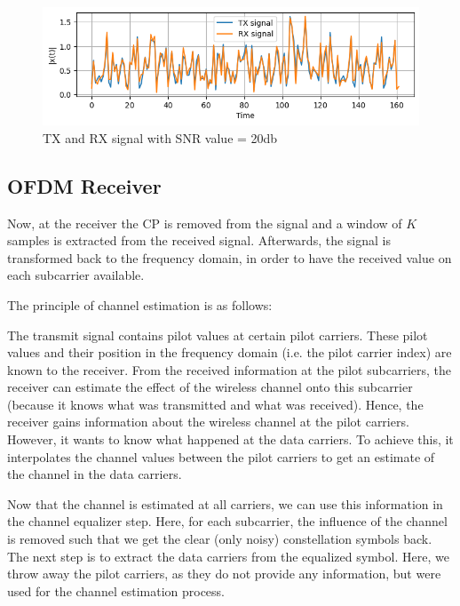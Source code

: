 \begin{figure}[htbp]
    \centering
    \includegraphics[width=\textwidth]{../Source/results/tx_rx}
    \caption{TX and RX signal with SNR value = 20db}
    \label{tx_rx}
\end{figure}

\subsection{OFDM Receiver}

Now, at the receiver the CP is removed from the signal and a window of $K$ samples is extracted from the received signal. Afterwards, the signal is transformed back to the frequency domain, in order to have the received value on each subcarrier available.

The principle of channel estimation is as follows:

The transmit signal contains pilot values at certain pilot carriers. These pilot values and their position in the frequency domain (i.e. the pilot carrier index) are known to the receiver. From the received information at the pilot subcarriers, the receiver can estimate the effect of the wireless channel onto this subcarrier (because it knows what was transmitted and what was received). Hence, the receiver gains information about the wireless channel at the pilot carriers. However, it wants to know what happened at the data carriers. To achieve this, it interpolates the channel values between the pilot carriers to get an estimate of the channel in the data carriers.

Now that the channel is estimated at all carriers, we can use this information in the channel equalizer step. Here, for each subcarrier, the influence of the channel is removed such that we get the clear (only noisy) constellation symbols back. The next step is to extract the data carriers from the equalized symbol. Here, we throw away the pilot carriers, as they do not provide any information, but were used for the channel estimation process.

